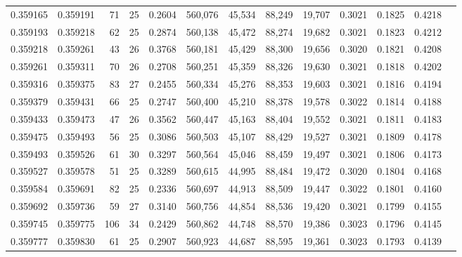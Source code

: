 \begin{tabular}{rrrrrrrrrrrrr}
0.359165 & 0.359191 &    71 &  25 &                                     0.2604 & 560,076 &  45,534 &  88,249 &  19,707 & 0.3021 & 0.1825 & 0.4218 \\
0.359193 & 0.359218 &    62 &  25 &                                     0.2874 & 560,138 &  45,472 &  88,274 &  19,682 & 0.3021 & 0.1823 & 0.4212 \\
0.359218 & 0.359261 &    43 &  26 &                                     0.3768 & 560,181 &  45,429 &  88,300 &  19,656 & 0.3020 & 0.1821 & 0.4208 \\
0.359261 & 0.359311 &    70 &  26 &                                     0.2708 & 560,251 &  45,359 &  88,326 &  19,630 & 0.3021 & 0.1818 & 0.4202 \\
0.359316 & 0.359375 &    83 &  27 &                                     0.2455 & 560,334 &  45,276 &  88,353 &  19,603 & 0.3021 & 0.1816 & 0.4194 \\
0.359379 & 0.359431 &    66 &  25 &                                     0.2747 & 560,400 &  45,210 &  88,378 &  19,578 & 0.3022 & 0.1814 & 0.4188 \\
0.359433 & 0.359473 &    47 &  26 &                                     0.3562 & 560,447 &  45,163 &  88,404 &  19,552 & 0.3021 & 0.1811 & 0.4183 \\
0.359475 & 0.359493 &    56 &  25 &                                     0.3086 & 560,503 &  45,107 &  88,429 &  19,527 & 0.3021 & 0.1809 & 0.4178 \\
0.359493 & 0.359526 &    61 &  30 &                                     0.3297 & 560,564 &  45,046 &  88,459 &  19,497 & 0.3021 & 0.1806 & 0.4173 \\
0.359527 & 0.359578 &    51 &  25 &                                     0.3289 & 560,615 &  44,995 &  88,484 &  19,472 & 0.3020 & 0.1804 & 0.4168 \\
0.359584 & 0.359691 &    82 &  25 &                                     0.2336 & 560,697 &  44,913 &  88,509 &  19,447 & 0.3022 & 0.1801 & 0.4160 \\
0.359692 & 0.359736 &    59 &  27 &                                     0.3140 & 560,756 &  44,854 &  88,536 &  19,420 & 0.3021 & 0.1799 & 0.4155 \\
0.359745 & 0.359775 &   106 &  34 &                                     0.2429 & 560,862 &  44,748 &  88,570 &  19,386 & 0.3023 & 0.1796 & 0.4145 \\
0.359777 & 0.359830 &    61 &  25 &                                     0.2907 & 560,923 &  44,687 &  88,595 &  19,361 & 0.3023 & 0.1793 & 0.4139 \\

\end{tabular}
